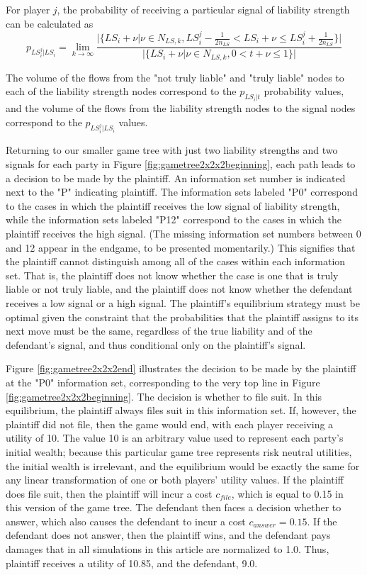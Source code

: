 \documentclass{article}
\begin{document}
For player $j$, the probability of receiving a particular signal of liability strength can be calculated as
\begin{equation} 
p_{LS_i^j|LS_i} = \lim_{k\to\infty} \frac{\lvert\{LS_i+\nu |\nu \in N_{LS,k}, LS_i^j - \frac{1}{2n_{LS} }<LS_i+\nu \leq LS_i^j + \frac{1}{2n_{LS} }\}\rvert}{\lvert\{LS_i+\nu |\nu \in N_{LS,k}, 0<t+\nu \leq 1 \}\rvert}
\end{equation}

\noindent The volume of the flows from the "not truly liable" and "truly liable" nodes to each of the liability strength nodes correspond to the $p_{LS_i|t}$ probability values, and the volume of the flows from the liability strength nodes to the signal nodes correspond to the $p_{LS_i^j|LS_i}$ values. 

Returning to our smaller game tree with just two liability strengths and two signals for each party in Figure \ref{fig:gametree2x2x2beginning}, each path leads to a decision to be made by the plaintiff. An information set number is indicated next to the "P" indicating plaintiff. The information sets labeled "P0" correspond to the cases in which the plaintiff receives the low signal of liability strength, while the information sets labeled "P12" correspond to the cases in which the plaintiff receives the high signal. (The missing information set numbers between 0 and 12 appear in the endgame, to be presented momentarily.) This signifies that the plaintiff cannot distinguish among all of the cases within each information set. That is, the plaintiff does not know whether the case is one that is truly liable or not truly liable, and the plaintiff does not know whether the defendant receives a low signal or a high signal. The plaintiff's equilibrium strategy must be optimal given the constraint that the probabilities that the plaintiff assigns to its next move must be the same, regardless of the true liability and of the defendant's signal, and thus conditional only on the plaintiff's signal. 

Figure \ref{fig:gametree2x2x2end} illustrates the decision to be made by the plaintiff at the "P0" information set, corresponding to the very top line in Figure \ref{fig:gametree2x2x2beginning}. The decision is whether to file suit. In this equilibrium, the plaintiff always files suit in this information set. If, however, the plaintiff did not file, then the game would end, with each player receiving a utility of 10. The value 10 is an arbitrary value used to represent each party's initial wealth; because this particular game tree represents risk neutral utilities, the initial wealth is irrelevant, and the equilibrium would be exactly the same for any linear transformation of one or both players' utility values. If the plaintiff does file suit, then the plaintiff will incur a cost $c_{file}$, which is equal to 0.15 in this version of the game tree. The defendant then faces a decision whether to answer, which also causes the defendant to incur a cost $c_{answer}=0.15$. If the defendant does not answer, then the plaintiff wins, and the defendant pays damages that in all simulations in this article are normalized to 1.0. Thus, plaintiff receives a utility of 10.85, and the defendant, 9.0.
\end{document}
